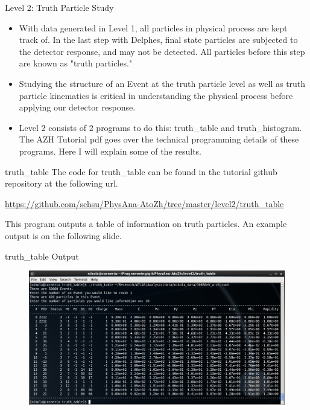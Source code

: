 \documentclass{beamer}
\begin{document}
	\begin{frame}{Level 2: Truth Particle Study}
		\begin{itemize}
\item<1->With data generated in Level 1, all particles in physical process are kept track of. In the last step with Delphes, final state particles are subjected to the detector response, and may not be detected. All particles before this step are known as "truth particles."

\bigskip

\item<1->Studying the structure of an Event at the truth particle level as well as truth particle kinematics is critical in understanding the physical process before applying our detector response.

\bigskip

\item<1->Level 2 consists of 2 programs to do this: truth\_table and truth\_histogram. The AZH Tutorial pdf goes over the technical programming details of these programs. Here I will explain some of the results.
		\end{itemize}
	\end{frame}
	\begin{frame}{truth\_table}
The code for truth\_table can be found in the tutorial github repository at the following url.

\bigskip

\url{https://github.com/schsu/PhysAna-AtoZh/tree/master/level2/truth_table}

\bigskip

This program outputs a table of information on truth particles. An example output is on the following slide.
	\end{frame}
	\begin{frame}{truth\_table Output}
		\begin{figure}
			\centering
			\includegraphics[width = \linewidth]{truth_table_output.png}
		\end{figure}
	\end{frame}
\end{document}
